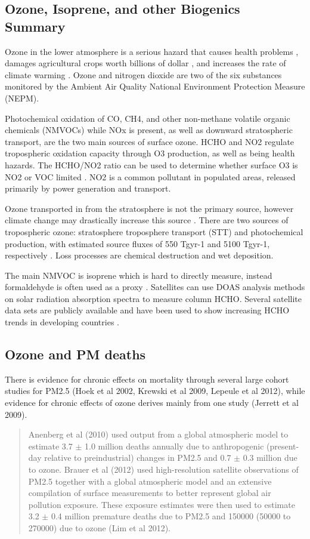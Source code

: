 \subsection{Ozone, Isoprene, and other Biogenics Summary}
Ozone in the lower atmosphere is a serious hazard that causes health problems \cite{Hsieh_2013}, damages agricultural crops worth billions of dollar \cite{Avnery_2011}, and increases the rate of climate warming \cite{IPCC_2013_chap8}. 
Ozone and nitrogen dioxide are two of the six substances monitored by the Ambient Air Quality National Environment Protection Measure (NEPM). 
  
Photochemical oxidation of CO, CH4, and other non-methane volatile organic chemicals (NMVOCs) while NOx is present, as well as downward stratospheric transport, are the two main sources of surface ozone.
HCHO and NO2 regulate tropospheric oxidation capacity through O3 production, as well as being health hazards.
The HCHO/NO2 ratio can be used to determine whether surface O3 is NO2 or VOC limited \cite{Mahajan_2015}.
NO2 is a common pollutant in populated areas, released primarily by power generation and transport. 

Ozone transported in from the stratosphere is not the primary source, however climate change may drastically increase this source \cite{Hegglin_2009}.
There are two sources of tropospheric ozone: stratosphere troposphere transport (STT) and photochemical production, with estimated source fluxes of 550 Tgyr-1 and 5100 Tgyr-1, respectively \cite{Stevenson_2006}. 
Loss processes are chemical destruction and wet deposition.

The main NMVOC is isoprene \cite{Guenther_2006} which is hard to directly measure, instead formaldehyde is often used as a proxy \cite{Marais_2012,bauwens2013satellite}. 
Satellites can use DOAS analysis methods on solar radiation absorption spectra to measure column HCHO.
Several satellite data sets are publicly available and have been used to show increasing HCHO trends in developing countries \cite{Mahajan_2015}.
  
\subsection{Ozone and PM deaths}

There is evidence for chronic effects on mortality through several large cohort studies for PM2.5 (Hoek et al 2002, Krewski et al 2009, Lepeule et al 2012), while evidence for chronic effects of ozone derives mainly from one study (Jerrett et al 2009). 

\begin{quote}
Anenberg et al (2010) used output from a global atmospheric model to estimate 3.7 $\pm$ 1.0 million deaths annually due to anthropogenic (present-day relative to preindustrial) changes in PM2.5 and 0.7 $\pm$ 0.3 million due to ozone. Brauer et al (2012) used high-resolution satellite observations of PM2.5 together with a global atmospheric model and an extensive compilation of surface measurements to better represent global air pollution exposure. These exposure estimates were then used to estimate 3.2 $\pm$ 0.4 million premature deaths due to PM2.5 and 150000 (50000 to 270000) due to ozone (Lim et al 2012).
\end{quote} 